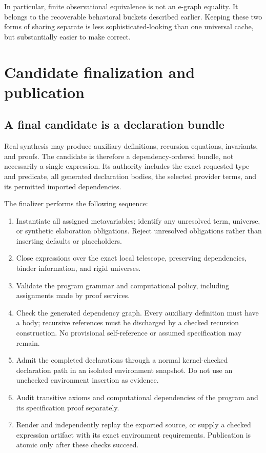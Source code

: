 \documentclass[11pt,letterpaper]{article}
\theoremstyle{definition}
\theoremstyle{remark}
\begin{document}
In particular, finite observational equivalence is not an e-graph equality. It belongs to the recoverable behavioral buckets described earlier. Keeping these two forms of sharing separate is less sophisticated-looking than one universal cache, but substantially easier to make correct.

\section{Candidate finalization and publication}
\label{sec:validation}

\subsection{A final candidate is a declaration bundle}

Real synthesis may produce auxiliary definitions, recursion equations, invariants, and proofs. The candidate is therefore a dependency-ordered bundle, not necessarily a single expression. Its authority includes the exact requested type and predicate, all generated declaration bodies, the selected provider terms, and its permitted imported dependencies.

The finalizer performs the following sequence:
\begin{enumerate}
\item Instantiate all assigned metavariables; identify any unresolved term, universe, or synthetic elaboration obligations. Reject unresolved obligations rather than inserting defaults or placeholders.
\item Close expressions over the exact local telescope, preserving dependencies, binder information, and rigid universes.
\item Validate the program grammar and computational policy, including assignments made by proof services.
\item Check the generated dependency graph. Every auxiliary definition must have a body; recursive references must be discharged by a checked recursion construction. No provisional self-reference or assumed specification may remain.
\item Admit the completed declarations through a normal kernel-checked declaration path in an isolated environment snapshot. Do not use an unchecked environment insertion as evidence.
\item Audit transitive axioms and computational dependencies of the program and its specification proof separately.
\item Render and independently replay the exported source, or supply a checked expression artifact with its exact environment requirements. Publication is atomic only after these checks succeed.
\end{enumerate}
\end{document}
